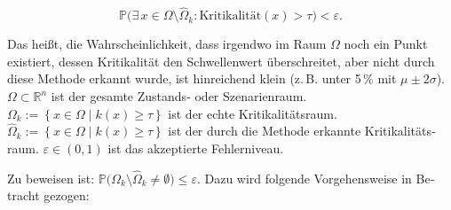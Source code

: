 \begin{otherlanguage}{ngerman}
\[ 
\mathbb{P}\bigl(\exists\, x \in \Omega \setminus \widehat{\Omega}_k : \text{Kritikalität}(x) > \tau \bigr) < \varepsilon. 
\]

Das heißt, die Wahrscheinlichkeit, dass irgendwo im Raum $\Omega$ noch ein Punkt existiert, dessen Kritikalität den Schwellenwert überschreitet, aber nicht durch diese Methode erkannt wurde, ist hinreichend klein (z.\,B. unter 5\,\% mit $\mu \pm 2\sigma$). $\Omega \subset \mathbb{R}^{n}$ ist der gesamte Zustands- oder Szenarienraum. $\Omega_k := \left\{ x \in \Omega \;\big|\; k(x) \ge \tau \right\}$ ist der echte Kritikalitätsraum. $\widehat{\Omega}_k := \left\{ x \in \Omega \;\big|\; k(x) \ge \tau \right\}$ ist der durch die Methode erkannte Kritikalitätsraum. $\varepsilon \in (0,1)$ ist das akzeptierte Fehlerniveau.

Zu beweisen ist: $\mathbb{P}\bigl( \Omega_k \setminus \widehat{\Omega}_k \neq \emptyset \bigr) \le \varepsilon.$ Dazu wird folgende Vorgehensweise in Betracht gezogen: 



\end{otherlanguage}
